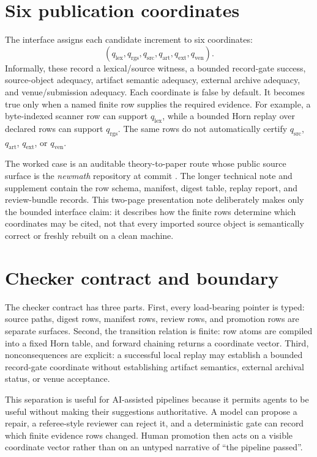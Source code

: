 \documentclass[runningheads]{llncs}
\newcommand{\qlex}{q_{\mathrm{lex}}}
\newcommand{\qrgs}{q_{\mathrm{rgs}}}
\newcommand{\qsrc}{q_{\mathrm{src}}}
\newcommand{\qart}{q_{\mathrm{art}}}
\newcommand{\qext}{q_{\mathrm{ext}}}
\newcommand{\qven}{q_{\mathrm{ven}}}
\begin{document}
\section{Six publication coordinates}

The interface assigns each candidate increment to six coordinates:
\[
(\qlex,\qrgs,\qsrc,\qart,\qext,\qven).
\]
Informally, these record a lexical/source witness, a bounded record-gate
success, source-object adequacy, artifact semantic adequacy, external archive
adequacy, and venue/submission adequacy.  Each coordinate is false by default.
It becomes true only when a named finite row supplies the required evidence.
For example, a byte-indexed scanner row can support \(\qlex\), while a bounded
Horn replay over declared rows can support \(\qrgs\).  The same rows do not
automatically certify \(\qsrc\), \(\qart\), \(\qext\), or \(\qven\).

The worked case is an auditable theory-to-paper route whose public source
surface is the \emph{newmath} repository at commit
\cite{bedc-newmath-source}.  The longer technical note and supplement contain
the row schema, manifest, digest table, replay report, and review-bundle
records.  This two-page presentation note deliberately makes only the bounded
interface claim: it describes how the finite rows determine which coordinates
may be cited, not that every imported source object is semantically correct or
freshly rebuilt on a clean machine.

\section{Checker contract and boundary}

The checker contract has three parts.  First, every load-bearing pointer is
typed: source paths, digest rows, manifest rows, review rows, and promotion rows
are separate surfaces.  Second, the transition relation is finite: row atoms are
compiled into a fixed Horn table, and forward chaining returns a coordinate
vector.  Third, nonconsequences are explicit: a successful local replay may
establish a bounded record-gate coordinate without establishing artifact
semantics, external archival status, or venue acceptance.

This separation is useful for AI-assisted pipelines because it permits agents to
be useful without making their suggestions authoritative.  A model can propose
a repair, a referee-style reviewer can reject it, and a deterministic gate can
record which finite evidence rows changed.  Human promotion then acts on a
visible coordinate vector rather than on an untyped narrative of ``the pipeline
passed''.
\end{document}
